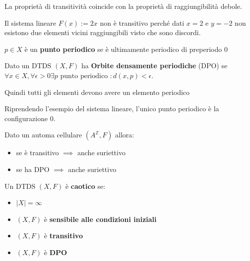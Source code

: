 \begin{nota}
    La proprietà di transitività coincide con la proprietà di raggiungibilità debole.
\end{nota}

\begin{esempio}
    Il sistema lineare $F(x):= 2x$ non è transitivo perché dati $x=2$ e $y=-2$ 
    non esistono due elementi vicini raggiungibili visto che sono discordi.
\end{esempio}

\begin{definizione}
    $p\in X$ è un \textbf{punto periodico} se è ultimamente periodico di preperiodo
    $0$
\end{definizione}

\begin{definizione} 
    Dato un DTDS $(X,F)$ ha \textbf{Orbite densamente periodiche} (DPO) se
    $\forall x\in X, \forall \epsilon>0 \exists p \text{ punto periodico }:  d(x,p)<\epsilon$. 

    Quindi tutti gli elementi devono avere un elemento periodico
\end{definizione}

\begin{esempio}
    Riprendendo l'esempio del sistema lineare, l'unico punto periodico è la configurazione $0$.
\end{esempio}
\begin{teorema}
    Dato un automa cellulare $(A^\mathbb{Z},F)$ allora:
    \begin{itemize}
        \item se è transitivo $\implies$ anche suriettivo
        \item se ha DPO $\implies$ anche suriettivo
    \end{itemize}
\end{teorema}

\begin{definizione} 
    Un DTDS $(X,F)$ è \textbf{caotico} se:
    \begin{itemize}
        \item $|X|=\infty$ 
        \item $(X,F)$ è \textbf{sensibile alle condizioni iniziali}
        \item $(X,F)$ è \textbf{transitivo}
        \item $(X,F)$ è \textbf{DPO}
    \end{itemize}
\end{definizione}

